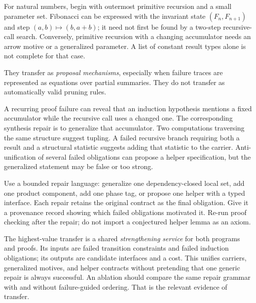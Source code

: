 For natural numbers, begin with outermost primitive recursion and a small parameter set. Fibonacci can be expressed with the invariant state $(F_n,F_{n+1})$ and step $(a,b)\mapsto(b,a+b)$; it need not first be found by a two-step recursive-call search. Conversely, primitive recursion with a changing accumulator needs an arrow motive or a generalized parameter. A list of constant result types alone is not complete for that case.

\ans They transfer as \emph{proposal mechanisms}, especially when failure traces are represented as equations over partial summaries. They do not transfer as automatically valid pruning rules.

A recurring proof failure can reveal that an induction hypothesis mentions a fixed accumulator while the recursive call uses a changed one. The corresponding synthesis repair is to generalize that accumulator. Two computations traversing the same structure suggest tupling. A failed recursive branch requiring both a result and a structural statistic suggests adding that statistic to the carrier. Anti-unification of several failed obligations can propose a helper specification, but the generalized statement may be false or too strong.

Use a bounded repair language: generalize one dependency-closed local set, add one product component, add one phase tag, or propose one helper with a typed interface. Each repair retains the original contract as the final obligation. Give it a provenance record showing which failed obligations motivated it. Re-run proof checking after the repair; do not import a conjectured helper lemma as an axiom.

The highest-value transfer is a shared \emph{strengthening service} for both programs and proofs. Its inputs are failed transition constraints and failed induction obligations; its outputs are candidate interfaces and a cost. This unifies carriers, generalized motives, and helper contracts without pretending that one generic repair is always successful. An ablation should compare the same repair grammar with and without failure-guided ordering. That is the relevant evidence of transfer.
